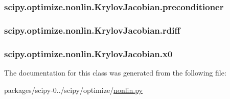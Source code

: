 \subsubsection[{preconditioner}]{\setlength{\rightskip}{0pt plus 5cm}scipy.\+optimize.\+nonlin.\+Krylov\+Jacobian.\+preconditioner}\label{classscipy_1_1optimize_1_1nonlin_1_1KrylovJacobian_a98b72fd92b75305dea6a16c777e67a58}
\hypertarget{classscipy_1_1optimize_1_1nonlin_1_1KrylovJacobian_ab440ccc561ce3908b5b282c50a9bf9bc}{}
\subsubsection[{rdiff}]{\setlength{\rightskip}{0pt plus 5cm}scipy.\+optimize.\+nonlin.\+Krylov\+Jacobian.\+rdiff}\label{classscipy_1_1optimize_1_1nonlin_1_1KrylovJacobian_ab440ccc561ce3908b5b282c50a9bf9bc}
\hypertarget{classscipy_1_1optimize_1_1nonlin_1_1KrylovJacobian_aec7afce23bc6cc8588b166d9c3dd842a}{}
\subsubsection[{x0}]{\setlength{\rightskip}{0pt plus 5cm}scipy.\+optimize.\+nonlin.\+Krylov\+Jacobian.\+x0}\label{classscipy_1_1optimize_1_1nonlin_1_1KrylovJacobian_aec7afce23bc6cc8588b166d9c3dd842a}


The documentation for this class was generated from the following file\+:\begin{DoxyCompactItemize}
\item 
packages/scipy-\/0../scipy/optimize/\hyperlink{nonlin_8py}{nonlin.\+py}\end{DoxyCompactItemize}
